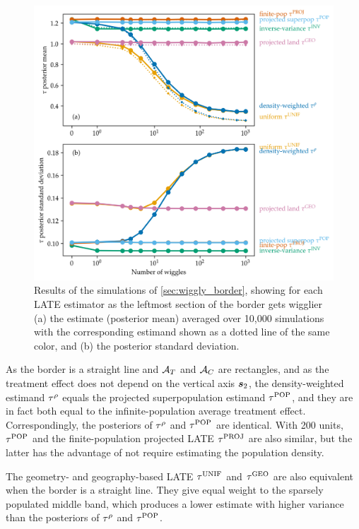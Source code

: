 \begin{figure}[!tb]
	\centering
	\includegraphics[height=0.6\textheight]{figures/wiggly_boundaries_posteriors.png}
	\caption{
		\label{fig:wiggly_boundaries_posteriors}
		Results of the simulations of \autoref{sec:wiggly_border}, showing for each LATE estimator as the leftmost section of the border gets wigglier (a) the estimate (posterior mean) averaged over 10,000 simulations with the corresponding estimand shown as a dotted line of the same color, and (b) the posterior standard deviation.
	}
\end{figure}
    
	As the border is a straight line and \(\mathcal{A}{}_{T}\) and \(\mathcal{A}{}_{C}\) are rectangles,
and as the treatment effect does not depend on the vertical axis \(\bm{s}_2\),
the density-weighted estimand \(\tau^{\rho}\) equals the projected superpopulation estimand \(\tau^{\mathrm{POP}}\),
and they are in fact both equal to the infinite-population average treatment effect.
Correspondingly, the posteriors of \(\tau^{\rho}\) and \(\tau^{\mathrm{POP}}\) are identical.
With 200 units, \(\tau^{\mathrm{POP}}\) and the finite-population projected LATE \(\tau^{\mathrm{PROJ}}\) are also similar, but the latter has the advantage of not require estimating the population density.

	The geometry- and geography-based LATE \(\tau^{\mathrm{UNIF}}\) and \(\tau^{\mathrm{GEO}}\) are also equivalent when the border is a straight line.
They give equal weight to the sparsely populated middle band, which produces a lower estimate with higher variance than the posteriors of \(\tau^{\rho}\) and \(\tau^{\mathrm{POP}}\).

